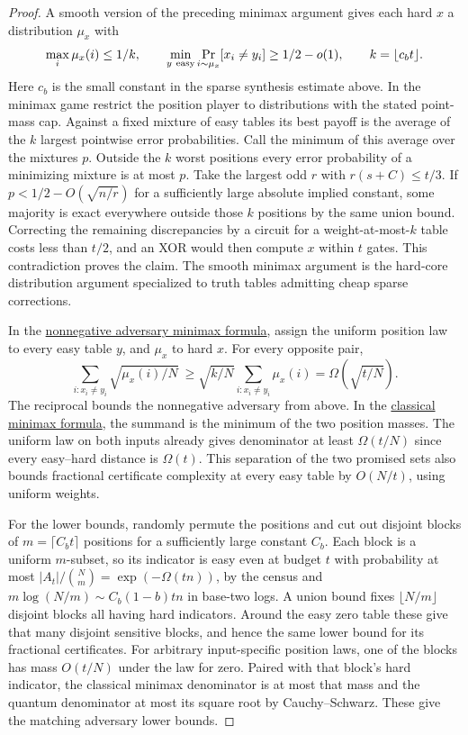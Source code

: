 \begin{proof}
A smooth version of the preceding minimax argument gives each hard \(x\) a distribution \(\mu_x\) with
\[
 \max_i\mu_x(i)\le1/k,\qquad
 \min_{y\ {\rm easy}}\Pr_{i\sim\mu_x}[x_i\ne y_i]\ge1/2-o(1),
 \qquad k=\lfloor c_b t\rfloor .
\]
Here \(c_b\) is the small constant in the sparse synthesis estimate above. In the minimax game restrict the position player to distributions with the stated point-mass cap. Against a fixed mixture of easy tables its best payoff is the average of the \(k\) largest pointwise error probabilities. Call the minimum of this average over the mixtures \(p\). Outside the \(k\) worst positions every error probability of a minimizing mixture is at most \(p\). Take the largest odd \(r\) with \(r(s+C)\le t/3\). If \(p<1/2-O(\sqrt{n/r})\) for a sufficiently large absolute implied constant, some majority is exact everywhere outside those \(k\) positions by the same union bound. Correcting the remaining discrepancies by a circuit for a weight-at-most-\(k\) table costs less than \(t/2\), and an XOR would then compute \(x\) within \(t\) gates. This contradiction proves the claim. The smooth minimax argument is the hard-core distribution argument specialized to truth tables admitting cheap sparse corrections.

In the \href{https://theoryofcomputing.org/articles/v002a001/}{nonnegative adversary minimax formula}, assign the uniform position law to every easy table \(y\), and \(\mu_x\) to hard \(x\). For every opposite pair,
\[
 \sum_{i:x_i\ne y_i}\sqrt{\mu_x(i)/N}
 \ \ge\sqrt{k/N}\sum_{i:x_i\ne y_i}\mu_x(i)=\Omega(\sqrt{t/N}).
\]
The reciprocal bounds the nonnegative adversary from above. In the \href{https://drops.dagstuhl.de/entities/document/10.4230/LIPIcs.STACS.2018.8}{classical minimax formula}, the summand is the minimum of the two position masses. The uniform law on both inputs already gives denominator at least \(\Omega(t/N)\) since every easy--hard distance is \(\Omega(t)\). This separation of the two promised sets also bounds fractional certificate complexity at every easy table by \(O(N/t)\), using uniform weights.

For the lower bounds, randomly permute the positions and cut out disjoint blocks of \(m=\lceil C_b t\rceil\) positions for a sufficiently large constant \(C_b\). Each block is a uniform \(m\)-subset, so its indicator is easy even at budget \(t\) with probability at most \(|A_t|/\binom Nm=\exp(-\Omega(t n))\), by the census and \(m\log(N/m)\sim C_b(1-b)tn\) in base-two logs. A union bound fixes \(\lfloor N/m\rfloor\) disjoint blocks all having hard indicators. Around the easy zero table these give that many disjoint sensitive blocks, and hence the same lower bound for its fractional certificates. For arbitrary input-specific position laws, one of the blocks has mass \(O(t/N)\) under the law for zero. Paired with that block's hard indicator, the classical minimax denominator is at most that mass and the quantum denominator at most its square root by Cauchy--Schwarz. These give the matching adversary lower bounds.
\end{proof}

